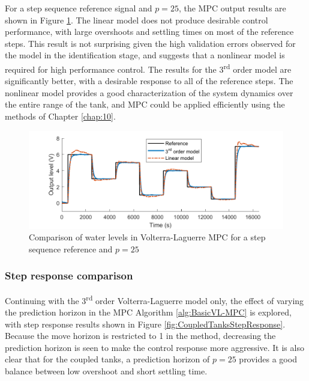 For a step sequence reference signal and $p=25$, the MPC output results are shown in Figure \ref{fig:CoupledTanksStepSequence}. The linear model does not produce desirable control performance, with large overshoots and settling times on most of the reference steps. This result is not surprising given the high validation errors observed for the model in the identification stage, and suggests that a nonlinear model is required for high performance control. The results for the 3\textsuperscript{rd} order model are significantly better, with a desirable response to all of the reference steps. The nonlinear model provides a good characterization of the system dynamics over the entire range of the tank, and MPC could be applied efficiently using the methods of Chapter \ref{chap:10}.

\begin{figure}[h]
\centering
\includegraphics[width=1\textwidth]{Chapter11_ControlStudy/CoupledTanksStepSequence.pdf}
\caption{Comparison of water levels in Volterra-Laguerre MPC for a step sequence reference and $p=25$}
\label{fig:CoupledTanksStepSequence}
\end{figure}

\subsubsection{Step response comparison}

Continuing with the 3\textsuperscript{rd} order Volterra-Laguerre model only, the effect of varying the prediction horizon in the MPC Algorithm \ref{alg:BasicVL-MPC} is explored, with step response results shown in Figure \ref{fig:CoupledTanksStepResponse}. Because the move horizon is restricted to 1 in the method, decreasing the prediction horizon is seen to make the control response more aggressive. It is also clear that for the coupled tanks, a prediction horizon of $p=25$ provides a good balance between low overshoot and short settling time.

